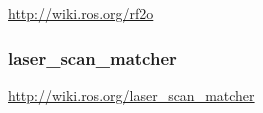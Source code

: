 \url{http://wiki.ros.org/rf2o}


\begin{comment}
--------------------------------------------------------------------------------
    <node
        if="$(arg enable_laser_scan_matcher)"
        pkg="laser_scan_matcher" type="laser_scan_matcher_node" name="laser_scan_matcher_node"
        output="screen">

        <param name="base_frame" value="base_link"/>
        <param name="fixed_frame" value="odom" />
        <param name="use_odom" value="true" />
        <param name="use_imu" value="false" />
    </node>
\end{comment}
\subsubsection{laser\_scan\_matcher}

\url{http://wiki.ros.org/laser_scan_matcher}





\begin{comment}
--------------------------------------------------------------------------------
\subsubsection{gmapping}

- This package contains a ROS wrapper for OpenSlam's Gmapping.
- The gmapping package provides laser-based SLAM (Simultaneous Localization and Mapping), as a ROS node called slam\_gmapping.
- Using slam\_gmapping, you can create a 2-D occupancy grid map from laser and pose data collected by a mobile robot.
\url{http://wiki.ros.org/gmapping}

Benötigt eine TF--Transformation zwischen base\_link und odom. Mittels der Odometry und dem Laser--Scans erzeugt er eine TF--Transformation zwischen map und odom.
\end{comment}



\begin{comment}
--------------------------------------------------------------------------------
\subsubsection{Vergleich der Trajektorie von Odom und rf2o}

- Trajektorie der Robotino--Odometry bestimmen.
- Herausfiltern der Odometry Nachrichten aus den Bag--Dateien
- Odometry aus den Laser--Scans bestimmen und Trajektorie aufzeichen.
- Trajektorien vergleichen
\end{comment}



